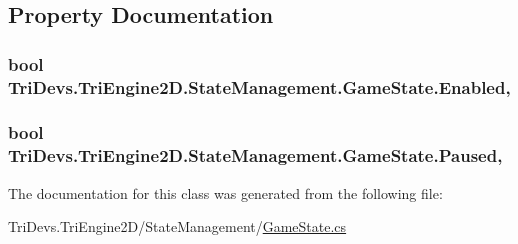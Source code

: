 \subsection{Property Documentation}
\hypertarget{class_tri_devs_1_1_tri_engine2_d_1_1_state_management_1_1_game_state_aee11105734b6d29be5e29a8d8248a499}{
\subsubsection[{Enabled}]{\setlength{\rightskip}{0pt plus 5cm}bool Tri\-Devs.\-Tri\-Engine2\-D.\-State\-Management.\-Game\-State.\-Enabled\hspace{0.3cm}{\ttfamily [get]}, {\ttfamily [set]}}}\label{class_tri_devs_1_1_tri_engine2_d_1_1_state_management_1_1_game_state_aee11105734b6d29be5e29a8d8248a499}
\hypertarget{class_tri_devs_1_1_tri_engine2_d_1_1_state_management_1_1_game_state_aa90383289e518b7c606a479c48b28510}{
\subsubsection[{Paused}]{\setlength{\rightskip}{0pt plus 5cm}bool Tri\-Devs.\-Tri\-Engine2\-D.\-State\-Management.\-Game\-State.\-Paused\hspace{0.3cm}{\ttfamily [get]}, {\ttfamily [set]}}}\label{class_tri_devs_1_1_tri_engine2_d_1_1_state_management_1_1_game_state_aa90383289e518b7c606a479c48b28510}


The documentation for this class was generated from the following file\-:\begin{DoxyCompactItemize}
\item 
Tri\-Devs.\-Tri\-Engine2\-D/\-State\-Management/\hyperlink{_game_state_8cs}{Game\-State.\-cs}\end{DoxyCompactItemize}
